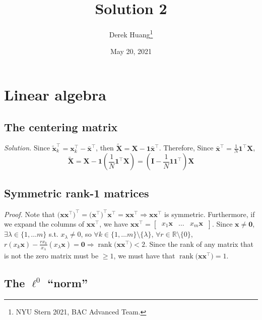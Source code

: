 \documentclass{article}
\title{Solution 2}
\author{Derek Huang\thanks{NYU Stern 2021, BAC Advanced Team.}}
\date{May 20, 2021}%
\numberwithin{equation}{section}
\begin{document}
\maketitle
\thispagestyle{fancy}

\section{Linear algebra}

\subsection{The centering matrix}

\textit{Solution.} Since $ \tilde{\mathbf{x}}_k^\top = \mathbf{x}_k^\top -
\bar{\mathbf{x}}^\top $, then $ \tilde{\mathbf{X}} = \mathbf{X} -
\mathbf{1}\bar{\mathbf{x}}^\top $. Therefore, Since $ \bar{\mathbf{x}}^\top =
\frac{1}{N}\mathbf{1}^\top\mathbf{X} $,
\begin{equation*}
    \tilde{\mathbf{X}} = \mathbf{X} -
    \mathbf{1}\left(\frac{1}{N}\mathbf{1}^\top\mathbf{X}\right) =
    \left(\mathbf{I} - \frac{1}{N}\mathbf{11}^\top\right)\mathbf{X}
\end{equation*}

\subsection{Symmetric rank-1 matrices}

\textit{Proof.} Note that $ \big(\mathbf{xx}^\top\big)^\top =
\big(\mathbf{x}^\top\big)^\top\mathbf{x}^\top = \mathbf{xx}^\top \Rightarrow
\mathbf{xx}^\top $ is symmetric. Furthermore, if we expand the columns of
$ \mathbf{xx}^\top $, we have $ \mathbf{xx}^\top = \begin{bmatrix}
\ x_1\mathbf{x} & \ldots & x_m\mathbf{x} \ \end{bmatrix} $. Since $ \mathbf{x}
\ne \mathbf{0} $, $ \exists \lambda \in \{1, \ldots m\} $ s.t.
$ x_\lambda \ne 0 $, so $ \forall k \in \{1, \ldots m\} \setminus
\{\lambda\} $, $ \forall r \in \mathbb{R}\setminus \{0\} $,
$ r(x_k\mathbf{x}) - \frac{rx_k}{x_\lambda}(x_\lambda\mathbf{x}) = \mathbf{0} 
\Rightarrow \operatorname{rank}\big(\mathbf{xx}^\top\big) < 2 $. Since the
rank of any matrix that is not the zero matrix must be $ \ge 1 $, we must have
that $ \operatorname{rank}\big(\mathbf{xx}^\top\big) = 1 $.

\subsection{The $ \ell^0 $ ``norm''}
\end{document}
